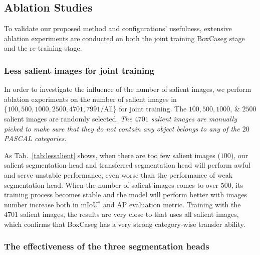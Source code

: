 \documentclass[final]{cvpr}
\begin{document}
\vspace{-1mm}
\subsection{Ablation Studies}
\vspace{-1mm}

To validate our proposed method and configurations' usefulness, extensive ablation experiments are conducted on both the joint training BoxCaseg stage and the re-training stage. 

\vspace{-3mm}
\subsubsection{Less salient images for joint training}
\vspace{-1mm}

In order to investigate the influence of the number of salient images, we perform ablation experiments on the number of salient images in $\{100, 500, 1000, 2500, 4701, 7991/\text{All}\}$ for joint training. The $100, 500, 1000$, \& $2500$ salient images are randomly selected. \textit{The $4701$ salient images are manually picked to make sure that they do not contain any object belongs to any of the $20$ PASCAL categories.}


As Tab.~\ref{tab:lessalient} shows, when there are too few salient images ($100$), our salient segmentation head and transferred segmentation head will perform awful and serve unstable performance, even worse than the performance of weak segmentation head. When the number of salient images comes to over $500$, its training process becomes stable and the model will perform better with images number increase both in mIoU$^{*}$ and AP evaluation metric. Training with the $4701$ salient images, the results are very close to that uses all salient images, which confirms that BoxCaseg has a very strong category-wise transfer ability.





\vspace{-3mm}
\subsubsection{The effectiveness of the three segmentation heads}
\vspace{-1mm}
\end{document}
